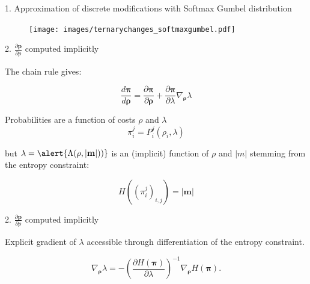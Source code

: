 \documentclass[10pt,aspectratio=169]{beamer}
\begin{document}
\begin{frame}{1. Approximation of discrete modifications with Softmax Gumbel distribution}
    \begin{figure}[h]
        \texttt{[image: images/ternarychanges\_softmaxgumbel.pdf]}
    \end{figure}
\end{frame}



\begin{frame}{2. $\frac{\partial \mathbf{p}}{\partial \rho}$ computed implicitly}

The chain rule gives:

\begin{equation}
\frac{d \bm{\pi}}{d \bm{\rho}} = \frac{\partial \bm{\pi}}{\partial \bm{\rho}} + \frac{\partial \bm{\pi}}{\partial \lambda} \nabla_{\bm{\rho}} \lambda
\label{eq:gradientprobabilities}
\end{equation}

\pause

    Probabilities are a function of costs $\rho$ and $\lambda$
    \begin{equation}
        \pi_i^j = P_i^j\left(\rho_{i}, \lambda\right)%
    \end{equation}
    
    \pause
    
    but $\lambda = \alert{\Lambda(\rho,|\mathbf{m}|))}$ is an (implicit) function of $\rho$ and $|m|$ stemming from the entropy constraint:
    
    \begin{equation}
        H\left(\left(\pi_i^j\right)_{i,j}\right)=|\mathbf{m}|
    \end{equation}
    
    \pause

\end{frame}

\begin{frame}{2. $\frac{\partial \mathbf{p}}{\partial \rho}$ computed implicitly}

Explicit gradient of $\lambda$ accessible through differentiation of the entropy constraint.

    \begin{equation}
    \nabla_{\bm{\rho}} \lambda =  -\left( \frac{\partial  H(\bm{\pi})}{\partial \lambda}\right)^{-1} \nabla_{\bm{\rho}} H (\bm{\pi}) .
\label{eq:gradientimplicit}
\end{equation}
\end{frame}
\end{document}
